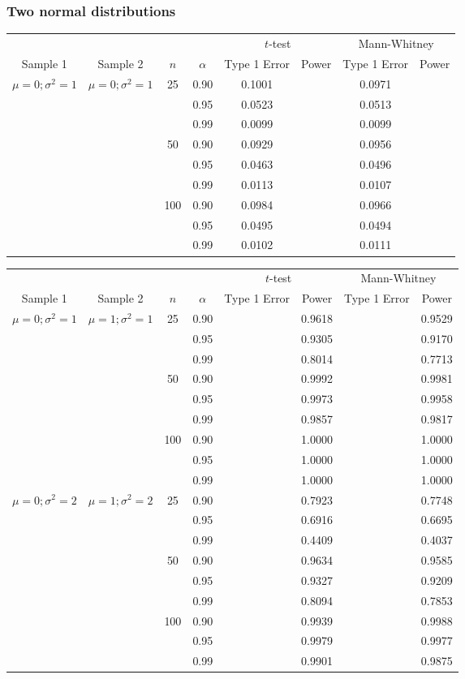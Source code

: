 \documentclass{article}
\begin{document}
\subsubsection*{Two normal distributions}
\begin{center}
\begin{tabular}{ c c c c c c c c}
\hline
&&&&\multicolumn{2}{c}{$t$-test}&\multicolumn{2}{c}{Mann-Whitney}\\
Sample 1&Sample 2&$n$&$\alpha$&Type 1 Error&Power&Type 1 Error&Power\\
\hline
$\mu = 0; \sigma^2 = 1$&$\mu = 0; \sigma^2 = 1$&25&0.90&0.1001&&0.0971\\
&&&0.95&0.0523&&0.0513\\
&&&0.99&0.0099&&0.0099\\
&&50&0.90&0.0929&&0.0956\\
&&&0.95&0.0463&&0.0496\\
&&&0.99&0.0113&&0.0107\\
&&100&0.90&0.0984&&0.0966\\
&&&0.95&0.0495&&0.0494\\
&&&0.99&0.0102&&0.0111\\
\end{tabular}
\end{center}
\begin{center}
\begin{tabular}{ c c c c c c c c}
\hline
&&&&\multicolumn{2}{c}{$t$-test}&\multicolumn{2}{c}{Mann-Whitney}\\
Sample 1&Sample 2&$n$&$\alpha$&Type 1 Error&Power&Type 1 Error&Power\\
\hline
$\mu = 0; \sigma^2 = 1$&$\mu = 1; \sigma^2 = 1$&25&0.90&&0.9618&&0.9529\\
&&&0.95&&0.9305&&0.9170\\
&&&0.99&&0.8014&&0.7713\\
&&50&0.90&&0.9992&&0.9981\\
&&&0.95&&0.9973&&0.9958\\
&&&0.99&&0.9857&&0.9817\\
&&100&0.90&&1.0000&&1.0000\\
&&&0.95&&1.0000&&1.0000\\
&&&0.99&&1.0000&&1.0000\\
$\mu = 0; \sigma^2 = 2$&$\mu = 1; \sigma^2 = 2$&25&0.90&&0.7923&&0.7748\\
&&&0.95&&0.6916&&0.6695\\
&&&0.99&&0.4409&&0.4037\\
&&50&0.90&&0.9634&&0.9585\\
&&&0.95&&0.9327&&0.9209\\
&&&0.99&&0.8094&&0.7853\\
&&100&0.90&&0.9939&&0.9988\\
&&&0.95&&0.9979&&0.9977\\
&&&0.99&&0.9901&&0.9875\\
\end{tabular}
\end{center}
\end{document}
